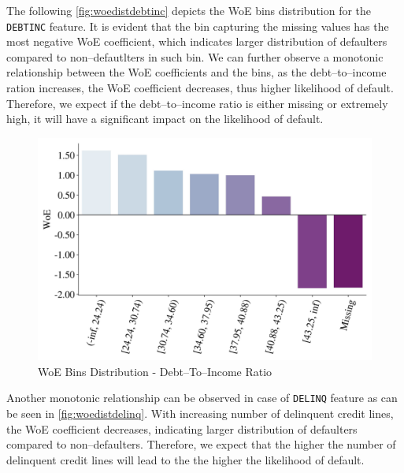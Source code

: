 The following \autoref{fig:woedistdebtinc} depicts the WoE bins distribution for the \texttt{DEBTINC} feature.
It is evident that the bin capturing the missing values has the most negative WoE coefficient, which indicates larger distribution of defaulters compared to non--defautlters in such bin. We can further observe a monotonic relationship between the WoE coefficients and the bins, as the debt--to--income ration increases, the WoE coefficient decreases, thus higher likelihood of default.
Therefore, we expect if the debt--to--income ratio is either missing or extremely high, it will have a significant impact on the likelihood of default.
\begin{figure}[H]
    \centering
    \caption{WoE Bins Distribution - Debt--To--Income Ratio}\vspace{0.5em}
    \label{fig:woedistdebtinc}
    \includegraphics[width=120mm]{Figures/WoE_Distribution_DEBTINC.jpg}
    
    \vspace{-1em}
\end{figure}

Another monotonic relationship can be observed in case of \texttt{DELINQ} feature as can be seen in \autoref{fig:woedistdelinq}. With increasing number of delinquent credit lines, the WoE coefficient decreases, indicating larger distribution of defaulters compared to non--defaulters. Therefore, we expect that the higher the number of delinquent credit lines will lead to the the higher the likelihood of default.


